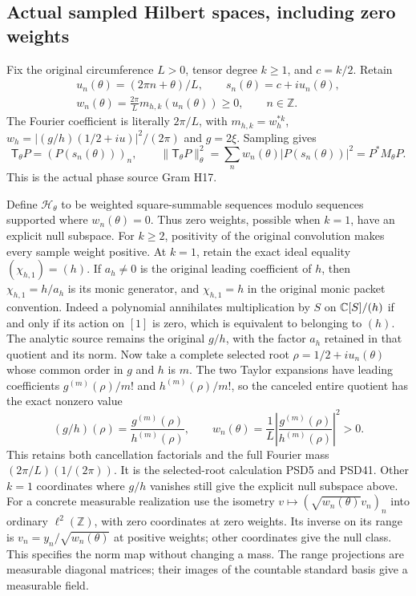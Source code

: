 \subsection{Actual sampled Hilbert spaces, including zero weights}

Fix the original circumference $L>0$, tensor degree $k\ge1$,
and $c=k/2$. Retain
\[
 \begin{gathered}
 u_n(\theta)=(2\pi n+\theta)/L,\qquad
 s_n(\theta)=c+iu_n(\theta),\\
 w_n(\theta)=\frac{2\pi}{L}m_{h,k}(u_n(\theta))\ge0,
 \qquad n\in\mathbb Z.
 \end{gathered}
 \tag{HCD17}
\]
The Fourier coefficient is literally $2\pi/L$, with
$m_{h,k}=w_h^{*k}$, $w_h=|(g/h)(1/2+iu)|^2/(2\pi)$
and $g=2\xi$. Sampling gives
\[
 \mathsf T_\theta P=(P(s_n(\theta)))_n,\qquad
 \|\mathsf T_\theta P\|_\theta^2
 =\sum_n w_n(\theta)|P(s_n(\theta))|^2=P^*M_\theta P.
 \tag{HCD18}
\]
This is the actual phase source Gram H17.

Define $\mathcal H_\theta$ to be weighted square-summable
sequences modulo sequences supported where $w_n(\theta)=0$.
Thus zero weights, possible when $k=1$, have an explicit
null subspace. For $k\ge2$, positivity of the original
convolution makes every sample weight positive.
At $k=1$, retain the exact ideal equality
$(\chi_{h,1})=(h)$. If $a_h\ne0$ is the original leading
coefficient of $h$, then $\chi_{h,1}=h/a_h$ is its monic
generator, and $\chi_{h,1}=h$ in the original monic packet
convention. Indeed a polynomial annihilates multiplication by
$S$ on $\mathbb C[S]/(h)$ if and only if its action on $[1]$ is
zero, which is equivalent to belonging to $(h)$.
The analytic source remains the original $g/h$, with
the factor $a_h$ retained in that quotient and its norm.
Now take a complete selected root
$\rho=1/2+iu_n(\theta)$ whose common order in $g$ and $h$
is $m$. The two Taylor expansions have leading coefficients
$g^{(m)}(\rho)/m!$ and $h^{(m)}(\rho)/m!$, so the canceled
entire quotient has the exact nonzero value
\[
 (g/h)(\rho)=\frac{g^{(m)}(\rho)}{h^{(m)}(\rho)},\qquad
 w_n(\theta)=\frac1L
 \left|\frac{g^{(m)}(\rho)}{h^{(m)}(\rho)}\right|^2>0.
 \tag{HCD18a}
\]
This retains both cancellation factorials and the full
Fourier mass $(2\pi/L)(1/(2\pi))$. It is the selected-root
calculation PSD5 and PSD41. Other $k=1$ coordinates where
$g/h$ vanishes still give the explicit null subspace above.
For a concrete measurable realization use the isometry
$v\mapsto(\sqrt{w_n(\theta)}v_n)_n$ into ordinary
$\ell^2(\mathbb Z)$, with zero coordinates at zero weights.
Its inverse on its range is
$v_n=y_n/\sqrt{w_n(\theta)}$ at positive weights; other
coordinates give the null class. This specifies the norm
map without changing a mass. The range projections are
measurable diagonal matrices; their images of the countable
standard basis give a measurable field.

